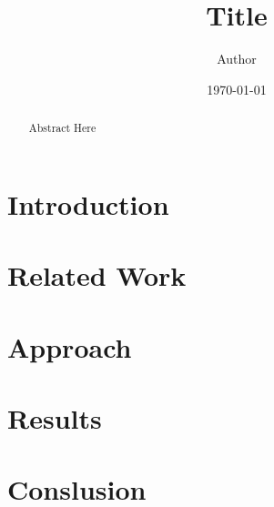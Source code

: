 \documentclass{article}
\title{\textbf{Title}}
\author{Author}
\date{\today}
\begin{document}
\def\deadlines{DDMMMYY}
\def\contribution{The contribution/objective of this work is...}
\def\status{The current status is...}
\def\venue{???}
\def\web{???}
\def\pglim{??}
\makecoversheet

\maketitle

\begin{abstract}
Abstract Here
\end{abstract}

\section{Introduction}

\section{Related Work}

\section{Approach}

\section{Results}

\section{Conslusion}



\end{document}
